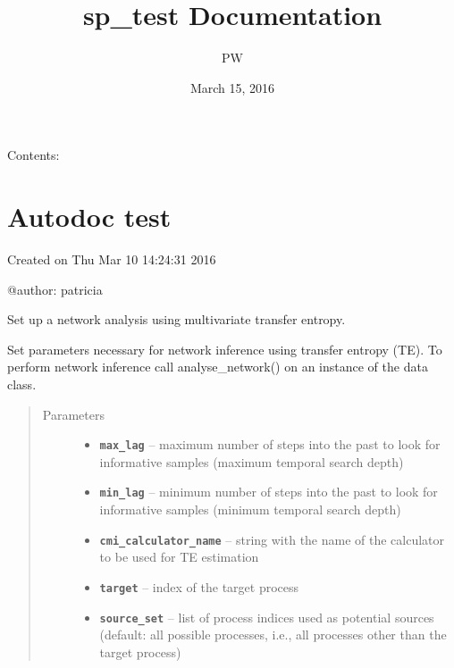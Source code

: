 \documentclass[letterpaper,10pt,english]{sphinxmanual}
\title{sp\_test Documentation}
\date{March 15, 2016}
\author{PW}
\begin{document}
\maketitle
\tableofcontents
{}\label{index::doc}


Contents:


\chapter{Autodoc test}
\label{index:welcome-to-sp-test-s-documentation}\label{index:module-multivariate_te}\label{index:autodoc-test}
Created on Thu Mar 10 14:24:31 2016

@author: patricia

\begin{fulllineitems}
\label{index:multivariate_te.Multivariate_te}
Set up a network analysis using multivariate transfer entropy.

Set parameters necessary for network inference using transfer entropy (TE).
To perform network inference call analyse\_network() on an instance of the
data class.
\begin{quote}\begin{description}
\item[{Parameters}] \leavevmode\begin{itemize}
\item {} 
\textbf{\texttt{max\_lag}} -- maximum number of steps into the past to look for informative
samples (maximum temporal search depth)

\item {} 
\textbf{\texttt{min\_lag}} -- minimum number of steps into the past to look for informative
samples (minimum temporal search depth)

\item {} 
\textbf{\texttt{cmi\_calculator\_name}} -- string with the name of the calculator to be used
for TE estimation

\item {} 
\textbf{\texttt{target}} -- index of the target process

\item {} 
\textbf{\texttt{source\_set}} -- list of process indices used as potential sources (default:
all possible processes, i.e., all processes other than the target
process)


\end{itemize}
\end{description}
\end{quote}
\end{fulllineitems}
\end{document}
